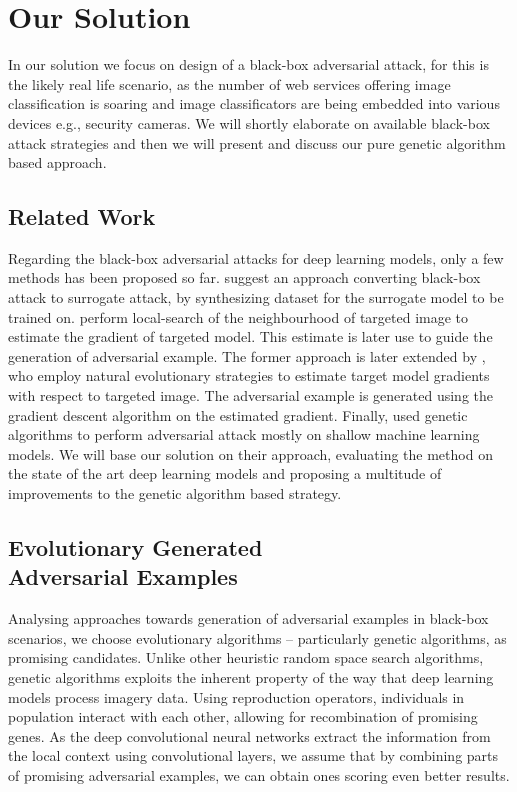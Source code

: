 \chapter{Our Solution}
\label{sec:solution}
In our solution we focus on design of a black-box adversarial attack, for this is the likely real life scenario, as the number of web services offering image classification is soaring and image classificators are being embedded into various devices e.g., security cameras. We will shortly elaborate on available black-box attack strategies and then we will present and discuss our pure genetic algorithm based approach.

\section{Related Work}
Regarding the black-box adversarial attacks for deep learning models, only a few methods has been proposed so far. \cite{DBLP:journals/corr/PapernotMGJCS16} suggest an approach converting black-box attack to surrogate attack, by synthesizing dataset for the surrogate model to be trained on. \cite{8014906} perform local-search of the neighbourhood of targeted image to estimate the gradient of targeted model. This estimate is later use to guide the generation of adversarial example. The former approach is later extended by \cite{DBLP:journals/corr/abs-1804-08598}, who employ natural evolutionary strategies to estimate target model gradients with respect to targeted image. The adversarial example is generated using the gradient descent algorithm on the estimated gradient. Finally, \cite{Vidnerova:2016:EGA:2955129.2955178} used genetic algorithms to perform adversarial attack mostly on shallow machine learning models. We will base our solution on their approach, evaluating the method on the state of the art deep learning models and proposing a multitude of improvements to the genetic algorithm based strategy.

\section[Evolutionary Generated Adversarial Examples]{Evolutionary Generated \\ Adversarial Examples}
\label{sec:pga}
Analysing approaches towards generation of adversarial examples in black-box scenarios, we choose evolutionary algorithms -- particularly genetic algorithms, as promising candidates. Unlike other heuristic random space search algorithms, genetic algorithms exploits the inherent property of the way that deep learning models process imagery data. Using reproduction operators, individuals in population interact with each other, allowing for recombination of promising genes. As the deep convolutional neural networks extract the information from the local context using convolutional layers, we assume that by combining parts of promising adversarial examples, we can obtain ones scoring even better results.

